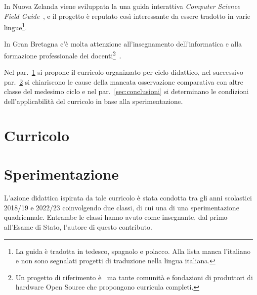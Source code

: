 \documentclass[a4paper]{easychair}
\begin{document}
In Nuova Zelanda viene sviluppata la una guida interattiva
\textit{Computer Science Field Guide}~\cite{UniComputerScienceEducationResearchGroupCanterbury2023},
e il progetto è reputato così interessante da essere tradotto in varie lingue\footnote{La guida è tradotta in tedesco, spagnolo e polacco. Alla lista manca l'italiano e non sono segnalati progetti di traduzione nella lingua italiana.}.

In Gran Bretagna c'è molta attenzione all'insegnamento dell'informatica
e alla formazione professionale dei docenti\footnote{Un progetto di riferimento è~\cite{nc4ce} ma tante comunità e fondazioni
di produttori di hardware Open Source che propongono curricula completi.
}~\cite{Fowler2021}.



Nel par.~\ref{sec:curricolo} si propone il curricolo organizzato per ciclo didattico,
nel successivo par.~\ref{sec:sperimentazione} si chiariscono le cause della mancata
osservazione comparativa con altre classe del medesimo ciclo e nel
par.~\ref{sec:conclusioni} si determinano le condizioni dell'applicabilità del curricolo in base
alla sperimentazione.


\section[Curricolo]{Curricolo}
\label{sec:curricolo}



\section{Sperimentazione}
\label{sec:sperimentazione}

L'azione didattica ispirata da tale curricolo è stata condotta tra gli anni scolastici
2018/19 e 2022/23 coinvolgendo due classi, di cui una di una sperimentazione quadriennale.
Entrambe le classi hanno avuto come insegnante, dal primo all'Esame di Stato,
l'autore di questo contributo.
\end{document}
